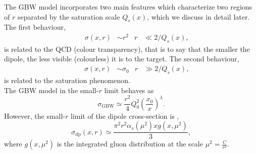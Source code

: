 \documentclass[11pt]{article}
\begin{document}
The GBW model incorporates two main features which characterize two regions of $r$ separated by the saturation scale $Q_s(x)$, which we discuss in detail later.
The first behaviour, 
\begin{align}
&& \sigma(x,r)&\sim r^2 & r&\ll 2/Q_s(x),
\end{align}
is related to the QCD (colour transparency), that is to say that the smaller the dipole, the less visible (colourless) it is to the target. 
The second behaviour,
\begin{align}
&& \sigma(x,r)&\sim \sigma_0 & r&\gg 2/Q_s(x),
\end{align}
is related to the saturation phenomenon. \\



The GBW model in the small-$r$ limit behaves as 
\begin{equation}
\sigma_{\mathrm{GBW}}\simeq\frac{r^2}{4} Q_0^2\left(\frac{x_0}{x}\right)^{\lambda}.
\end{equation}
However, the small-$r$ limit of the dipole cross-section is \cite{bgk2002}, 
\begin{equation}
\sigma_{\mathrm{dp}}(x,r)\simeq \frac{\pi^2 r^2\alpha_s(\mu^2) x g(x,\mu^2)}{3},
\end{equation}
where $g(x,\mu^2)$ is the integrated gluon distribution at the scale $\mu^2=\frac{C}{r^2}$.
\end{document}
